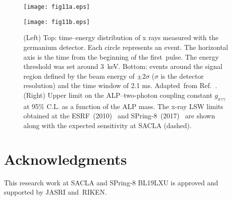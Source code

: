 \documentclass[10pt,a4paper]{article}%
\begin{document}
\begin{figure}[!t]
\begin{minipage}{0.5\hsize}
\centering
\texttt{[image: fig11a.eps]}
\end{minipage}
\begin{minipage}{0.5\hsize}
\vspace{2mm}
\centering
\texttt{[image: fig11b.eps]}
\end{minipage}
\caption{
(Left)
Top:
time--energy distribution of x rays measured with the germanium detector.
Each circle represents an event.
The horizontal axis is the time from the beginning of the first~pulse.
The energy threshold was set around 3~keV.
Bottom: 
events around the signal region defined by the beam energy of $\pm 2 \sigma$ ($\sigma$ is the detector resolution) and the time window of 2.1 ms.
Adapted~from Ref.~\cite{spring-8}.
(Right)
Upper limit on the ALP--two-photon coupling constant $g_{a\gamma\gamma}$ at 95\% C.L. as a function of the ALP mass.
The x-ray LSW limits obtained at the ESRF~(2010)~\cite{esrf} and SPring-8~(2017)~\cite{spring-8} are shown along with the expected sensitivity at SACLA (dashed).
\label{fig:lsw_result}}
\end{figure}   

\vspace{6pt} 

\section*{Acknowledgments}

This research work at SACLA and SPring-8 BL19LXU is approved and supported by JASRI and~RIKEN.
\end{document}
